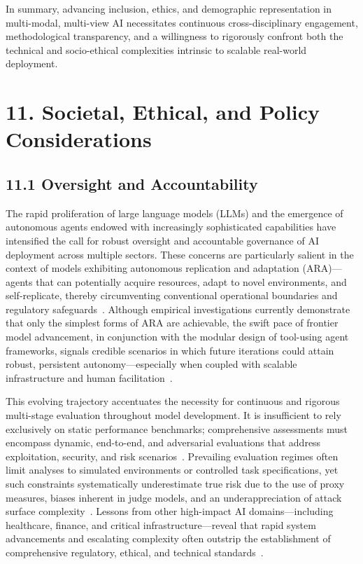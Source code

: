 \documentclass[11pt]{article}
\begin{document}
In summary, advancing inclusion, ethics, and demographic representation in multi-modal, multi-view AI necessitates continuous cross-disciplinary engagement, methodological transparency, and a willingness to rigorously confront both the technical and socio-ethical complexities intrinsic to scalable real-world deployment.

\section{11. Societal, Ethical, and Policy Considerations}

\subsection{11.1 Oversight and Accountability}

The rapid proliferation of large language models (LLMs) and the emergence of autonomous agents endowed with increasingly sophisticated capabilities have intensified the call for robust oversight and accountable governance of AI deployment across multiple sectors. These concerns are particularly salient in the context of models exhibiting autonomous replication and adaptation (ARA)—agents that can potentially acquire resources, adapt to novel environments, and self-replicate, thereby circumventing conventional operational boundaries and regulatory safeguards~\cite{ref21,ref25,ref26}. Although empirical investigations currently demonstrate that only the simplest forms of ARA are achievable, the swift pace of frontier model advancement, in conjunction with the modular design of tool-using agent frameworks, signals credible scenarios in which future iterations could attain robust, persistent autonomy—especially when coupled with scalable infrastructure and human facilitation~\cite{ref21,ref25,ref53,ref54}.

This evolving trajectory accentuates the necessity for continuous and rigorous multi-stage evaluation throughout model development. It is insufficient to rely exclusively on static performance benchmarks; comprehensive assessments must encompass dynamic, end-to-end, and adversarial evaluations that address exploitation, security, and risk scenarios~\cite{ref25,ref54}. Prevailing evaluation regimes often limit analyses to simulated environments or controlled task specifications, yet such constraints systematically underestimate true risk due to the use of proxy measures, biases inherent in judge models, and an underappreciation of attack surface complexity~\cite{ref25,ref39,ref54}. Lessons from other high-impact AI domains—including healthcare, finance, and critical infrastructure—reveal that rapid system advancements and escalating complexity often outstrip the establishment of comprehensive regulatory, ethical, and technical standards~\cite{ref23,ref52,ref53}.
\end{document}

